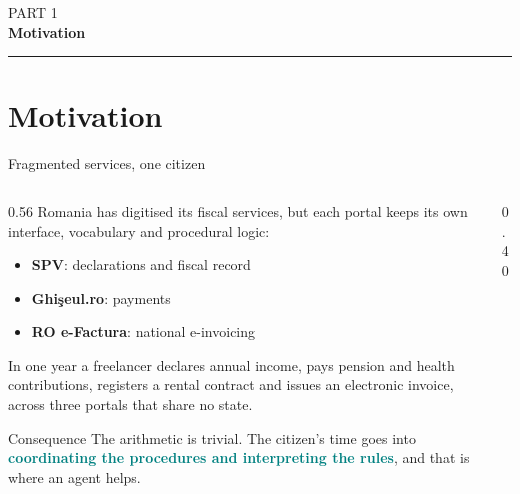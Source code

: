 \documentclass[aspectratio=169,10pt]{beamer}
\newcommand{\hl}[1]{\textcolor{teal}{\textbf{#1}}}      %
\newcommand{\risk}[1]{\textcolor{rust}{\textbf{#1}}}    %
\newcommand{\keypart}[2]{%
  \begin{frame}[plain, noframenumbering]
    \vfill
    \centering
    {\color{stone}\small #1}\\[0.35em]
    {\color{teal}\Large\bfseries #2}\\[0.9em]
    {\color{rust}\rule{0.25\paperwidth}{1.2pt}}
    \vfill\vfill
  \end{frame}%
}
\begin{document}
\keypart{PART 1}{Motivation}
\section{Motivation}

\begin{frame}{Fragmented services, one citizen}
  \begin{columns}[T]
    \begin{column}{0.56\textwidth}
      Romania has digitised its fiscal services, but each portal keeps its own interface,
      vocabulary and procedural logic:
      \begin{itemize}
        \item \textbf{SPV}: declarations and fiscal record
        \item \textbf{Ghi\c{s}eul.ro}: payments
        \item \textbf{RO e-Factura}: national e-invoicing
      \end{itemize}
      \medskip
      In one year a freelancer declares annual income, pays pension and health contributions,
      registers a rental contract and issues an electronic invoice, across three portals that
      share no state.
      \medskip
      \begin{block}{Consequence}
        The arithmetic is trivial. The citizen's time goes into \hl{coordinating the
        procedures and interpreting the rules}, and that is where an agent helps.
      \end{block}
    \end{column}
    \begin{column}{0.40\textwidth}
      \centering
    \end{column}
  \end{columns}
\end{frame}
\end{document}
